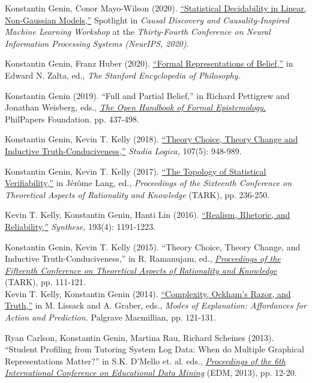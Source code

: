 \documentclass[12pt]{res} %
\begin{document}
\begin{resume}
Konstantin Genin, Conor Mayo-Wilson (2020). {\href{https://www.cmu.edu/dietrich/causality/CameraReadys-accepted\%20papers/46\%5cCameraReady\%5c2_LinGAM_Neurips_Camera_Ready.pdf}{``Statistical Decidability in Linear, Non-Gaussian Models,''}} Spotlight in {\em Causal Discovery and Causality-Inspired Machine Learning Workshop} at the {\em Thirty-Fourth Conference on Neural Information Processing Systems (NeurIPS, 2020)}.

Konstantin Genin, Franz Huber (2020). {\href{https://plato.stanford.edu/entries/formal-belief/}{``Formal Representations of Belief,''}} in Edward N. Zalta, ed., {\em The Stanford Encyclopedia of Philosophy.}

Konstantin Genin (2019). {``Full and Partial Belief,''} in Richard Pettigrew and Jonathan Weisberg, eds., \href{https://philpapers.org/archive/PETTOH-2.pdf}{{\em The Open Handbook of Formal Epistemology.}} PhilPapers Foundation. pp. 437-498.   

Konstantin Genin, Kevin T. Kelly (2018). \href{https://doi.org/10.1007/s11225-018-9809-5}{{``Theory Choice, Theory Change and Inductive Truth-Conduciveness,''}} {\em Studia Logica,} 107(5): 948-989. 

Konstantin Genin, Kevin T. Kelly (2017). \href{https://doi.org/10.4204/EPTCS.251.17}{``The Topology of Statistical Verifiability,''} in J\'{e}r\^{o}me Lang, ed., {\em Proceedings of the Sixteenth Conference on Theoretical Aspects of Rationality and Knowledge} (TARK), pp. 236-250. 

Kevin T. Kelly, Konstantin Genin, Hanti Lin (2016). \href{https://doi.org/10.1007/s11229-015-0993-9}{``Realism, Rhetoric, and Reliability,''} {\em Synthese,} 193(4): 1191-1223. 

Konstantin Genin, Kevin T. Kelly (2015). {``Theory Choice, Theory Change, and Inductive Truth-Conduciveness,''} in R. Ramanujam, ed., \href{https://www.imsc.res.in/tark/TARK2015-proceedings.pdf}{{\em Proceedings of the Fifteenth Conference on Theoretical Aspects of Rationality and Knowledge}} (TARK), pp. 111-121.\\ 

Kevin T. Kelly, Konstantin Genin (2014). \href{http://dx.doi.org/10.1057/9781137403865_9}{``Complexity, Ockham's Razor, and Truth,''} in M. Lissack and A. Graber, eds.,  {\em Modes of Explanation: Affordances for Action and Prediction.} Palgrave Macmillian, pp. 121-131.

Ryan Carlson, Konstantin Genin, Martina Rau, Richard Scheines (2013). ``Student Profiling from Tutoring System Log Data: When do Multiple Graphical Representations Matter?'' in S.K. D'Mello et. al. eds., \href{http://www.educationaldatamining.org/EDM2013/proceedings/EDM2013Proceedings.pdf}{\em Proceedings of the 6th International Conference on Educational Data Mining} (EDM, 2013), pp. 12-20.




\end{resume}
\end{document}
